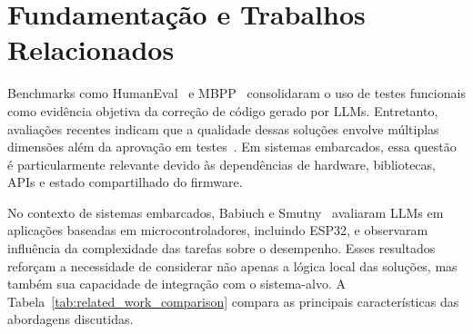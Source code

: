 \documentclass[12pt]{article}
\begin{document}
\section{Fundamentação e Trabalhos Relacionados}
\label{sec:relacionados}

Benchmarks como HumanEval~\cite{chen2021codex} e MBPP~\cite{austin2021program} consolidaram o uso de testes funcionais como evidência objetiva da correção de código gerado por LLMs. Entretanto, avaliações recentes indicam que a qualidade dessas soluções envolve múltiplas dimensões além da aprovação em testes~\cite{umama2025slr,nogueira2026probe,patcas2026quality}. Em sistemas embarcados, essa questão é particularmente relevante devido às dependências de hardware, bibliotecas, APIs e estado compartilhado do firmware.

No contexto de sistemas embarcados, Babiuch e Smutny~\cite{babiuch2026benchmarking} avaliaram LLMs em aplicações baseadas em microcontroladores, incluindo ESP32, e observaram influência da complexidade das tarefas sobre o desempenho. Esses resultados reforçam a necessidade de considerar não apenas a lógica local das soluções, mas também sua capacidade de integração com o sistema-alvo. A Tabela~\ref{tab:related_work_comparison} compara as principais características das abordagens discutidas.

\begin{table}[ht]
\centering
\caption{Comparação de abordagens para avaliação de código gerado por LLMs.}
\label{tab:related_work_comparison}
\end{table}
\end{document}
